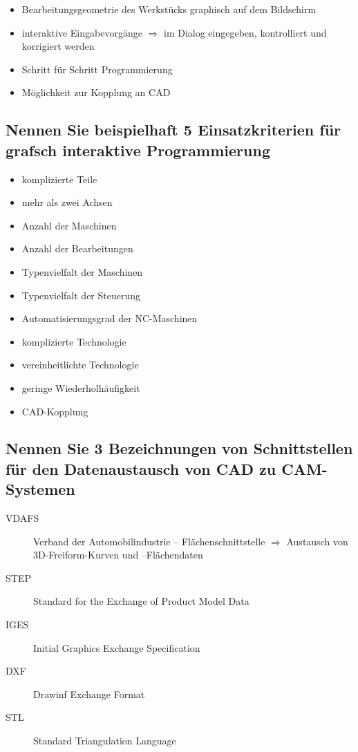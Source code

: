 \begin{itemize}
    \item Bearbeitungsgeometrie des Werkstücks graphisch auf dem Bildschirm
    \item interaktive Eingabevorgänge $\Rightarrow$ im Dialog eingegeben, kontrolliert 
        und korrigiert werden
    \item Schritt für Schritt Programmierung
    \item Möglichkeit zur Kopplung an CAD
\end{itemize}

\subsection*{Nennen Sie beispielhaft 5 Einsatzkriterien für grafsch interaktive Programmierung}

\begin{itemize}
    \item komplizierte Teile 
    \item mehr als zwei Achsen 
    \item Anzahl der Maschinen 
    \item Anzahl der Bearbeitungen 
    \item Typenvielfalt der Maschinen 
    \item Typenvielfalt der Steuerung 
    \item Automatisierungsgrad der NC-Maschinen 
    \item komplizierte Technologie
    \item vereinheitlichte Technologie 
    \item geringe Wiederholhäufigkeit 
    \item CAD-Kopplung
\end{itemize}

\subsection*{Nennen Sie 3 Bezeichnungen von Schnittstellen für den Datenaustausch von CAD zu CAM-Systemen}

\begin{description}
    \item[VDAFS] Verband der Automobilindustrie – Flächenschnittstelle $\Rightarrow$ Austausch von 3D-Freiform-Kurven und –Flächendaten 
    \item[STEP] Standard for the Exchange of Product Model Data 
    \item[IGES] Initial Graphics Exchange Specification 
    \item[DXF] Drawinf Exchange Format 
    \item[STL] Standard Triangulation Language 
\end{description}

